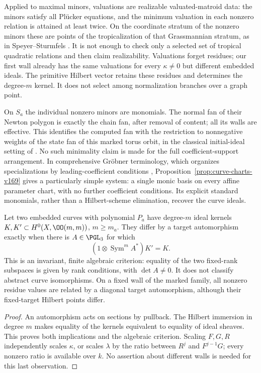 Applied to maximal minors, valuations are realizable valuated-matroid
data: the minors satisfy all Pl\"ucker equations, and the minimum
valuation in each nonzero relation is attained at least twice. On the coordinate stratum of the nonzero minors these are points
of the tropicalization of that Grassmannian stratum, as in
Speyer--Sturmfels \cite[Theorem~2.1 and Section~3]{SpeyerSturmfels169}.
It is not enough to check only a selected set of tropical quadratic
relations and then claim realizability. Valuations forget residues;
our first wall already has the same valuations for every $\kappa\ne0$
but different embedded ideals. The primitive Hilbert vector retains
these residues and determines the degree-$m$ kernel. It does not
select among normalization branches over a graph point.

On $S_a$ the individual nonzero minors are monomials. The normal fan
of their Newton polygon is exactly the chain fan, after removal of
content; all its walls are effective. This identifies the computed fan
with the restriction to nonnegative weights of the state fan of this marked torus orbit, in the classical
initial-ideal setting of \cite{BayerMorrison167}. No such minimality
claim is made for the full coefficient-support arrangement. In
comprehensive Gr\"obner terminology, which organizes specializations
by leading-coefficient conditions \cite{ManubensMontes169},
Proposition~\ref{prop:curve-charts-v169} gives a particularly simple
system: a single monic basis on every affine parameter chart, with no
further coefficient conditions. Its explicit standard monomials,
rather than a Hilbert-scheme elimination, recover the curve ideals.

\begin{proposition}
\label{prop:target-equivalence-v169}
Let two embedded curves with polynomial $P_a$ have degree-$m$
ideal kernels $K,K'\subset H^0(X,\OO(m,m))$, $m\geq m_a$.
They differ by a target automorphism exactly when there is
$A\in\PGL_3$ for which
\[
 (1\otimes\operatorname{Sym}^m A^*)K'=K.
\]
This is an invariant, finite algebraic criterion: equality of the
two fixed-rank subspaces is given by rank conditions, with $\det A\ne0$.
It does not classify abstract curve isomorphisms. On a fixed wall
of the marked family, all nonzero residue values are related by a
diagonal target automorphism, although their fixed-target Hilbert
points differ.
\end{proposition}
\begin{proof}
An automorphism acts on sections by pullback. The Hilbert immersion
in degree $m$ makes equality of the kernels equivalent to equality
of ideal sheaves. This proves both implications and the algebraic
criterion. Scaling $F,G,R$ independently scales $\kappa$, or scales
$\lambda$ by the ratio between $R^j$ and $F^{j-1}G$; every nonzero
ratio is available over $k$. No assertion about different walls is
needed for this last observation.
\end{proof}

